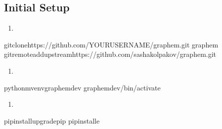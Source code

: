 \documentclass[letterpaper,10pt,english]{sphinxmanual}
\begin{document}
\subsection{Initial Setup}
\label{\detokenize{contributing:initial-setup}}\begin{enumerate}
%
\item {} 
\sphinxAtStartPar
{}

\end{enumerate}

\begin{sphinxVerbatim}[commandchars=\\\{\}]
gitclonehttps://github.com/YOUR\PYGZus{}USERNAME/graphem.git
graphem
gitremoteaddupstreamhttps://github.com/sashakolpakov/graphem.git
\end{sphinxVerbatim}
\begin{enumerate}
%
\setcounter{enumi}{1}
\item {} 
\sphinxAtStartPar
{}

\end{enumerate}

\begin{sphinxVerbatim}[commandchars=\\\{\}]
python\PYGZhy{}mvenvgraphem\PYGZhy{}dev
graphem\PYGZhy{}dev/bin/activate
\end{sphinxVerbatim}
\begin{enumerate}
%
\setcounter{enumi}{2}
\item {} 
\sphinxAtStartPar
{}

\end{enumerate}

\begin{sphinxVerbatim}[commandchars=\\\{\}]
pipinstall\PYGZhy{}\PYGZhy{}upgradepip
pipinstall\PYGZhy{}e
\end{sphinxVerbatim}
\end{document}
